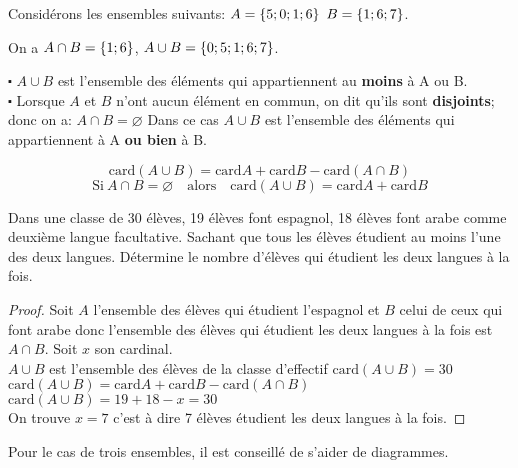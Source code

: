 \begin{example}
Considérons les ensembles  suivants:  $ A=\left\{5;0;1;6\right\}$  $ B=\left\{1;6;7\right\} $.

On a $A\cap B = \left\{1; 6\right\} $, $A\cup B = \left\{0;5;1;6;7\right\}$.


 \end{example}
\begin{remark}

$ \centerdot $ $A\cup B$ est l'ensemble des éléments qui appartiennent  au \textbf{moins} à A ou B.\\
$ \centerdot $ Lorsque $ A$ et  $ B$ n'ont aucun élément en commun, on dit qu'ils sont \textbf{disjoints}; donc on a: $ A\cap B=\varnothing $ Dans ce cas  $A\cup B$  est l'ensemble des éléments qui appartiennent à A \textbf{ ou bien} à B.
\end{remark}
\begin{property}
                 \[\textrm{card}(A\cup B)= \textrm{card}A  + \textrm{card}B- \textrm{card}(A\cap B)    \]
                  \[ \textrm{Si}\  A\cap B=\varnothing \quad \textrm{alors}\quad \textrm{card}(A\cup B)= \textrm{card}A  + \textrm{card}B    \]
\end{property}
\begin{exercice}

Dans une classe de 30 élèves, 19 élèves font espagnol, 18 élèves font arabe comme deuxième langue facultative. Sachant que tous les élèves étudient au moins l'une des deux  langues. Détermine le nombre d'élèves qui étudient les deux langues à la fois.
\end{exercice}


\begin{proof}

Soit $ A $ l'ensemble des élèves qui étudient l'espagnol et $ B $ celui de ceux qui font arabe donc l'ensemble des élèves qui étudient les deux langues à la fois est $A\cap B.  $ Soit $ x $ son cardinal. \\
$ A\cup B $  est l'ensemble des élèves de la classe d'effectif $ \textrm{card}(A\cup B)=30 $\\
$ \textrm{card}(A\cup B)= \textrm{card}A  + \textrm{card}B- \textrm{card}(A\cap B)    $\\
$\textrm{card}(A\cup B)= 19+18-x=30  $\\
 On trouve $ x=7 $ c'est à dire 7 élèves étudient les deux langues à la fois.
 \end{proof}
\begin{remark}
Pour le cas de trois ensembles, il est conseillé de s'aider de diagrammes.
\end{remark}

